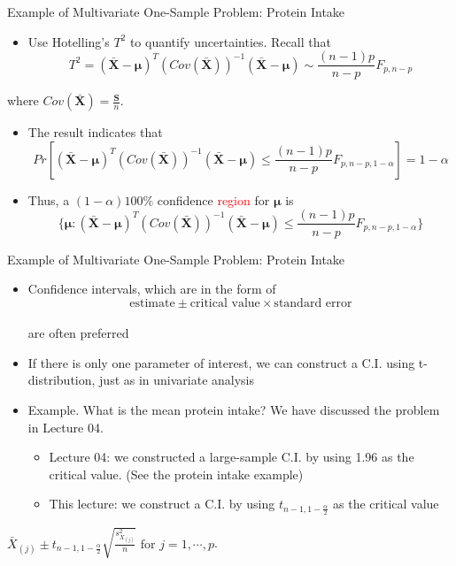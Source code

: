 \documentclass[
  ignorenonframetext,
]{beamer}
\providecommand{\tightlist}{%
  \setlength{\itemsep}{0pt}\setlength{\parskip}{0pt}}
\begin{document}
\begin{frame}{Example of Multivariate One-Sample Problem: Protein
Intake}
\protect\hypertarget{example-of-multivariate-one-sample-problem-protein-intake-2}{}
\begin{itemize}
\tightlist
\item
  Use Hotelling's \(T^2\) to quantify uncertainties. Recall that
  \[T^2=(\bar{\mathbf X} - \boldsymbol \mu)^T \left(Cov(\bar{\mathbf X})\right)^{-1}(\bar{\mathbf X} - \boldsymbol \mu)\sim \frac{(n-1)p}{n-p} F_{p, n-p}\]
\end{itemize}

where \(Cov(\bar{\mathbf X})=\frac{\mathbf S}{n}\).

\begin{itemize}
\item
  The result indicates that
  \[Pr[(\bar{\mathbf X} - \boldsymbol \mu)^T \left(Cov(\bar{\mathbf X})\right)^{-1}(\bar{\mathbf X} - \boldsymbol \mu)\le \frac{(n-1)p}{n-p} F_{p, n-p, 1-\alpha}]=1-\alpha\]
\item
  Thus, a \((1-\alpha)100\%\) confidence \textcolor{red}{region} for
  \(\boldsymbol \mu\) is
  \[\{\mathbf\mu: (\bar{\mathbf X} - \boldsymbol \mu)^T \left(Cov(\bar{\mathbf X})\right)^{-1}(\bar{\mathbf X} - \boldsymbol \mu)\le \frac{(n-1)p}{n-p} F_{p, n-p, 1-\alpha}\}\]
\end{itemize}
\end{frame}

\begin{frame}{Example of Multivariate One-Sample Problem: Protein
Intake}
\protect\hypertarget{example-of-multivariate-one-sample-problem-protein-intake-3}{}
\begin{itemize}
\tightlist
\item
  Confidence intervals, which are in the form of
  \[\mbox{estimate}\pm \mbox{critical value} \times \mbox{standard error}\]\\
  are often preferred
\item
  If there is only one parameter of interest, we can construct a C.I.
  using t-distribution, just as in univariate analysis
\item
  Example. What is the mean protein intake? We have discussed the
  problem in Lecture 04.

  \begin{itemize}
  \tightlist
  \item
    Lecture 04: we constructed a large-sample C.I. by using 1.96 as the
    critical value. (See the protein intake example)
  \item
    This lecture: we construct a C.I. by using
    \(t_{n-1, 1-\frac{\alpha}{2}}\) as the critical value
  \end{itemize}
\end{itemize}

\(\bar{X}_{(j)} \pm t_{n-1, 1- \frac{\alpha}{2}}\sqrt{\frac{s^2_{X_{(j)}}}{n}} \mbox{ for } j=1,\cdots, p\).
\end{frame}
\end{document}
